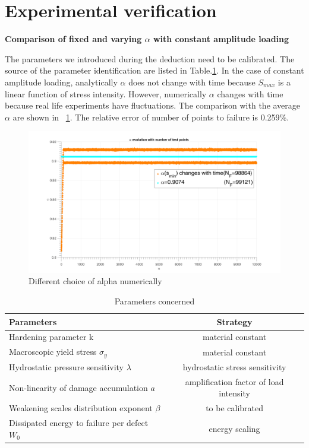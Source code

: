 \documentclass[3p,times,number,review]{elsarticle}
\newcommand{\figref}[1]{\figurename~\ref{#1}}
\begin{document}
\clearpage
\section{Experimental verification}
\textbf{Comparison of fixed and varying $\alpha$ with constant amplitude loading}

The parameters we introduced during the deduction need to be calibrated. The source of the parameter identification are listed in Table.\ref{paras}.
In the case of constant amplitude loading, analytically $\alpha$ does not change with time because $S_{max}$ is a linear function of stress intensity. However, numerically $\alpha$ changes with time because real life experiments have fluctuations. The comparison with the average $\alpha$ are shown in \figref{fig:alpha}. The relative error of number of points to failure is 0.259\%.

\begin{figure}[!h]
	\centering
	\includegraphics[width=\textwidth]{figures//alpha_change_with_time.png} 
	\caption{Different choice of alpha numerically}
	\label{fig:alpha}
\end{figure}


\begin{table}[!h]
	\centering
	\begin{tabular}{l|c}
		\hline
		\textbf{Parameters}                                  & \multicolumn{1}{c}{\textbf{Strategy}} \\ \hline
		Hardening parameter k                                & material constant                      \\
		Macroscopic yield stress $\sigma_y$                  & material constant                      \\
		Hydrostatic pressure sensitivity $\lambda$           & hydrostatic stress sensitivity         \\
		Non-linearity of damage accumulation  $a$        & amplification factor of load intensity      \\
		Weakening scales distribution exponent  $\beta$      & to be calibrated                          \\
		Dissipated energy to failure per defect  $W_0$ & energy scaling               \\ \hline
	\end{tabular}
	\caption{Parameters concerned}
\label{paras}
\end{table}
\end{document}
